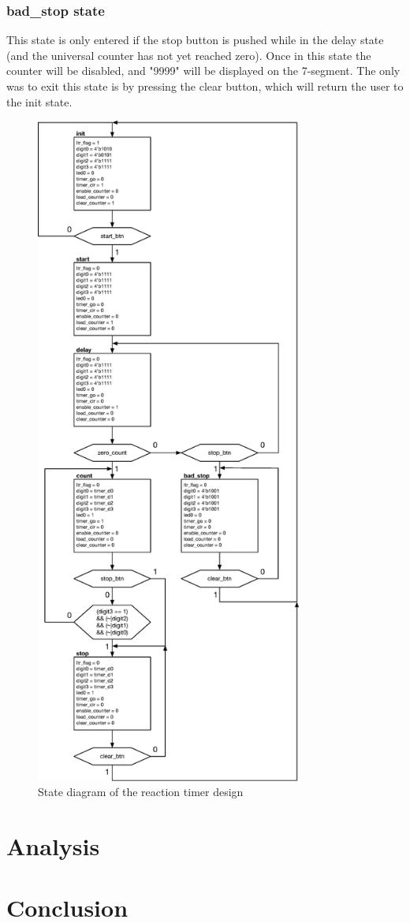 \documentclass[11pt]{article}
\begin{document}
\subsubsection{bad\_stop state}
This state is only entered if the stop button is pushed while in the delay state (and the universal counter has not yet reached zero). Once in this state the counter will be disabled, and "9999" will be displayed on the 7-segment. The only was to exit this state is by pressing the clear button, which will return the user to the init state.

\pagebreak
\begin{figure}[H]
	\includegraphics [width=3.45in]{state_diagram.eps}
	\centering
	\caption{State diagram of the reaction timer design}
	\label{fig:state_diagram}
\end{figure}

\section{Analysis}

\section{Conclusion}
\end{document}
